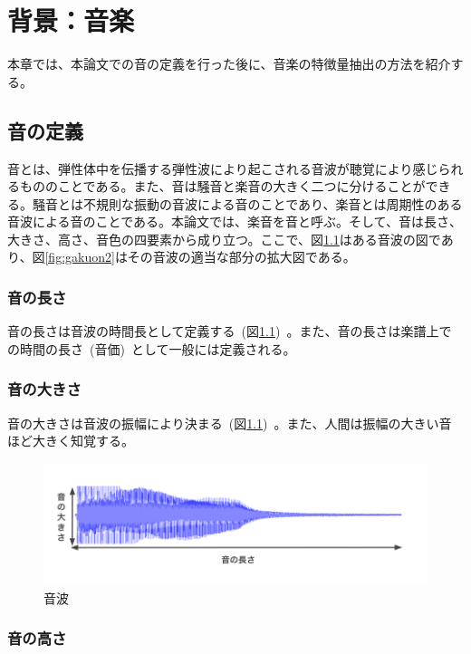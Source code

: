 \chapter{背景：音楽}

本章では、本論文での音の定義を行った後に、音楽の特徴量抽出の方法を紹介する。

\section{音の定義}

音とは、弾性体中を伝播する弾性波により起こされる音波が聴覚により感じられるもののことである。また、音は騒音と楽音の大きく二つに分けることができる。騒音とは不規則な振動の音波による音のことであり、楽音とは周期性のある音波による音のことである。本論文では、楽音を音と呼ぶ。そして、音は長さ、大きさ、高さ、音色の四要素から成り立つ。ここで、図\ref{fig:gakuon1}はある音波の図であり、図\ref{fig:gakuon2}はその音波の適当な部分の拡大図である。

\subsection{音の長さ}

音の長さは音波の時間長として定義する~(図\ref{fig:gakuon1})~。また、音の長さは楽譜上での時間の長さ~(音価)~として一般には定義される。

\subsection{音の大きさ}

音の大きさは音波の振幅により決まる~(図\ref{fig:gakuon1})~。また、人間は振幅の大きい音ほど大きく知覚する。

\begin{figure}[b]
\begin{center}
\includegraphics[width=0.85\hsize]{figure/gakuon1.png}
\caption{音波}
\label{fig:gakuon1}
\end{center}
\end{figure}


\subsection{音の高さ}


